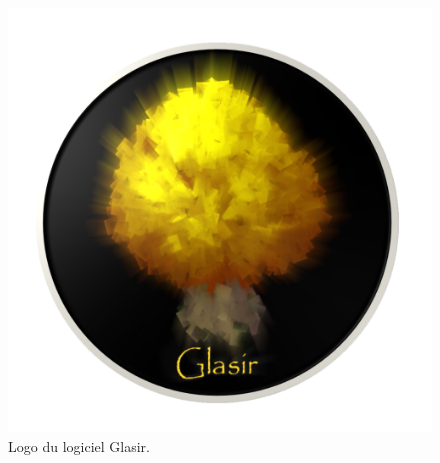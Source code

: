     \vspace{10mm}

    \begin{figure}[H]
        \centering
        \includegraphics[height=0.5\textwidth]{figure/glasir.png}
        \caption{Logo du logiciel Glasir.}
        \label{fig:glasir}
    \end{figure}
